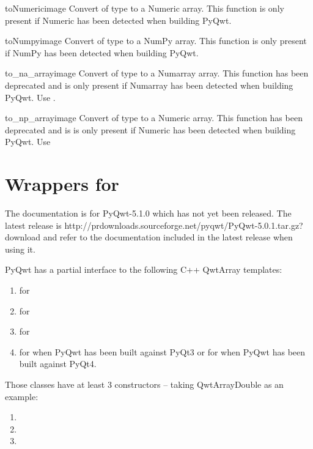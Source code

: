 \documentclass{manual}
\newcommand{\PyQwtLatestTarGz}{\ulink{PyQwt-5.0.1.tar.gz}
  {http://prdownloads.sourceforge.net/pyqwt/PyQwt-5.0.1.tar.gz?download}}
\newcommand{\Future}{
  \begin{notice}[warning]
    The documentation is for PyQwt-5.1.0 which has not yet been released. The
    latest release is \PyQwtLatestTarGz{} and refer to the documentation
    included in the latest release when using it.
  \end{notice}
}
\begin{document}
{\begin{funcdesc}{toNumeric}{image}
  Convert  of type  to a Numeric array. This function
  is only present if Numeric has been detected when building PyQwt.
\end{funcdesc}

\begin{funcdesc}{toNumpy}{image}
  Convert  of type  to a NumPy array. This function
  is only present if NumPy has been detected when building PyQwt.
\end{funcdesc}

\begin{funcdesc}{to_na_array}{image}
  Convert  of type  to a Numarray array. This function
  has been deprecated and is only present if Numarray has been detected when
  building PyQwt.  Use .
\end{funcdesc}

\begin{funcdesc}{to_np_array}{image}
  Convert  of type  to a Numeric array. This function
  has been deprecated and is is only present if Numeric has been detected when
  building PyQwt. Use 
\end{funcdesc}



\section{Wrappers for  \label{qwtarray}}

\Future{}

PyQwt has a partial interface to the following C++ QwtArray templates:
\begin{enumerate}
\item
   for 
\item
   for 
\item
   for 
\item
   for  when
  PyQwt has been built against PyQt3 or for  when
  PyQwt has been built against PyQt4.
\end{enumerate}

Those classes have at least 3 constructors -- taking QwtArrayDouble as an
example:
\begin{enumerate}
\item
\item
\item
\end{enumerate}

}
\end{document}
